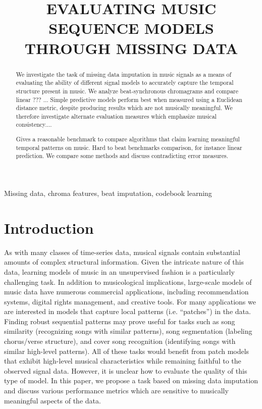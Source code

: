 \documentclass{article}
\title{EVALUATING MUSIC SEQUENCE MODELS THROUGH MISSING DATA}
\newcommand{\FIXME}[2][FIXME]{\textcolor{blue}{\textbf{#1}: \emph{#2}}}
\begin{document}
\ninept
%
\maketitle
%
\begin{abstract}
  We investigate the task of missing data imputation in music signals
  as a means of evaluating the ability of different signal models to
  accurately capture the temporal structure present in music.
  We analyze beat-synchronous chromagrams and compare linear ??? ...
  Simple predictive models perform best when measured using a
  Euclidean distance metric, despite producing results which are not
  musically meaningful.  We therefore investigate alternate evaluation
  measures which emphasize musical consistency....
%

Gives a reasonable benchmark to compare algorithms that claim learning meaningful
temporal patterns on music. Hard to beat benchmarks comparison, for instance linear
prediction. We compare some methods and discuss contradicting error measures. 
\end{abstract}
%
\begin{keywords}
Missing data, chroma features, beat imputation, codebook learning
\end{keywords}
%


\section{Introduction}
\label{sec:intro}
As with many classes of time-series data, musical signals contain
substantial amounts of complex structural information.  Given the
intricate nature of this data, learning models of music in an
unsupervised fashion is a particularly challenging task.  In addition
to musicological implications, large-scale models of music data have
numerous commercial applications, including recommendation systems,
digital rights management, and creative tools.  For many applications
we are interested in models that capture local patterns
(i.e. ``patches'') in the data.  Finding robust sequential patterns
may prove useful for tasks such as song similarity (recognizing songs
with similar patterns), song segmentation (labeling chorus/verse
structure), and cover song recognition (identifying songs with similar
high-level patterns).  All of these tasks would benefit from patch
models that exhibit high-level musical characteristics while remaining
faithful to the observed signal data.
However, it is unclear how to evaluate the quality of this type of
model.  In this paper, we propose a task based on missing data
imputation and discuss various performance metrics which are sensitive
to musically meaningful aspects of the data.
\end{document}
